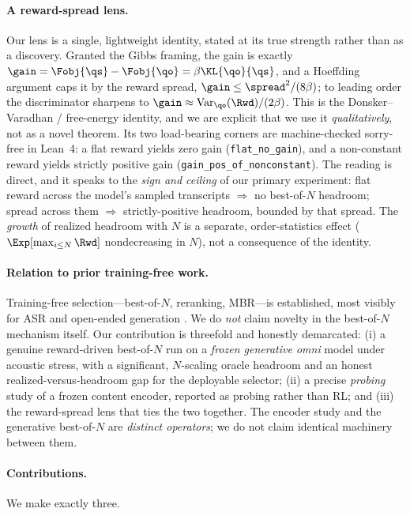 \paragraph{A reward-spread lens.}
Our lens is a single, lightweight identity, stated at its true strength rather than as a discovery. Granted the Gibbs framing, the gain is exactly $\gain=\Fobj{\qs}-\Fobj{\qo}=\beta\KL{\qo}{\qs}$, and a Hoeffding argument caps it by the reward spread, $\gain\le\spread^2/(8\beta)$; to leading order the discriminator sharpens to $\gain\approx\mathrm{Var}_{\qo}(\Rwd)/(2\beta)$. This is the Donsker--Varadhan / free-energy identity, and we are explicit that we use it \emph{qualitatively}, not as a novel theorem. Its two load-bearing corners are machine-checked sorry-free in Lean~4: a flat reward yields zero gain (\texttt{flat\_no\_gain}), and a non-constant reward yields strictly positive gain (\texttt{gain\_pos\_of\_nonconstant}). The reading is direct, and it speaks to the \emph{sign and ceiling} of our primary experiment: flat reward across the model's sampled transcripts $\Rightarrow$ no best-of-$N$ headroom; spread across them $\Rightarrow$ strictly-positive headroom, bounded by that spread. The \emph{growth} of realized headroom with $N$ is a separate, order-statistics effect ($\Exp[\max_{i\le N}\Rwd]$ nondecreasing in $N$), not a consequence of the identity.

\paragraph{Relation to prior training-free work.}
Training-free selection---best-of-$N$, reranking, MBR---is established, most visibly for ASR and open-ended generation \citep{beirami2024bon,mbrasr2025,ichihara2025mbr}. We do \emph{not} claim novelty in the best-of-$N$ mechanism itself. Our contribution is threefold and honestly demarcated: (i) a genuine reward-driven best-of-$N$ run on a \emph{frozen generative omni} model under acoustic stress, with a significant, $N$-scaling oracle headroom and an honest realized-versus-headroom gap for the deployable selector; (ii) a precise \emph{probing} study of a frozen content encoder, reported as probing rather than RL; and (iii) the reward-spread lens that ties the two together. The encoder study and the generative best-of-$N$ are \emph{distinct operators}; we do not claim identical machinery between them.

\paragraph{Contributions.}
We make exactly three.

